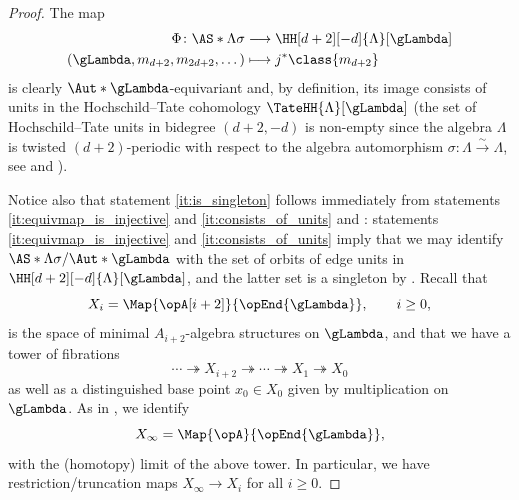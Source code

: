 \documentclass[a4paper]{amsart}
\begin{document}
\begin{proof}
  The map
  \begin{align*}
    \Phi\colon\AS*{\Lambda}{\sigma}    & \longrightarrow\HH[d+2][-d]{\Lambda}[\gLambda] \\
    (\gLambda,m_{d+2},m_{2d+2},\dots) & \longmapsto j^*\class{m_{d+2}}
  \end{align*}
  is clearly $\Aut*{\gLambda}$-equivariant and, by definition, its image
  consists of units in the Hochschild--Tate cohomology
  $\TateHH{\Lambda}[\gLambda]$ (the set of Hochschild--Tate units in bidegree
  $(d+2,-d)$ is non-empty since the algebra $\Lambda$ is twisted
  $(d+2)$-periodic with respect to the algebra automorphism
  $\sigma\colon\Lambda\stackrel{\sim}{\rightarrow}\Lambda$, see
   and ).

  Notice also that statement \eqref{it:is_singleton} follows immediately from
  statements \eqref{it:equivmap_is_injective} and \eqref{it:consists_of_units}
  and : statements \eqref{it:equivmap_is_injective} and
  \eqref{it:consists_of_units} imply that we may identify
  $\AS*{\Lambda}{\sigma}/\Aut*{\gLambda}$ with the set of orbits of edge units
  in $\HH[d+2][-d]{\Lambda}[\gLambda]$, and the latter set is a singleton by
  . Recall that
  \[
    X_i=\Map{\opA[i+2]}{\opEnd{\gLambda}},\qquad i\geq0,
  \]
  is the space of minimal $A_{i+2}$-algebra structures on $\gLambda$, and that
  we have a tower of fibrations
  \[
    \cdots\twoheadrightarrow X_{i+2}\twoheadrightarrow\cdots\twoheadrightarrow
    X_1\twoheadrightarrow X_0
  \]
  as well as a distinguished base point $x_0\in X_0$ given by multiplication on
  $\gLambda$. As in , we identify
  \[
    X_{\infty}=\Map{\opA}{\opEnd{\gLambda}},
  \]
  with the (homotopy) limit of the above tower. In particular, we have
  restriction/truncation maps $X_\infty\to X_i$ for all $i\geq0$.
  

\end{proof}
\end{document}
